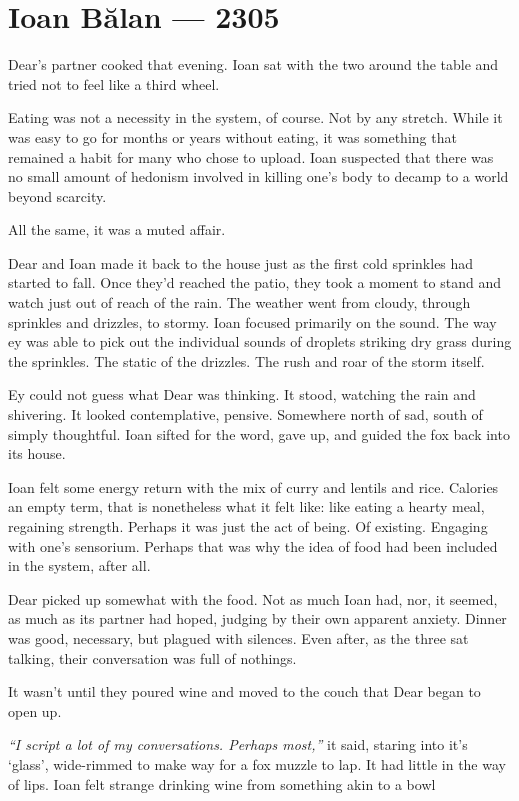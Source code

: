\hypertarget{ioan-bux103lan-2305}{%
\chapter*{Ioan Bălan — 2305}\label{ioan-bux103lan-2305}}

Dear's partner cooked that evening. Ioan sat with the two around the table and tried not to feel like a third wheel.

Eating was not a necessity in the system, of course. Not by any stretch. While it was easy to go for months or years without eating, it was something that remained a habit for many who chose to upload. Ioan suspected that there was no small amount of hedonism involved in killing one's body to decamp to a world beyond scarcity.

All the same, it was a muted affair.

Dear and Ioan made it back to the house just as the first cold sprinkles had started to fall. Once they'd reached the patio, they took a moment to stand and watch just out of reach of the rain. The weather went from cloudy, through sprinkles and drizzles, to stormy. Ioan focused primarily on the sound. The way ey was able to pick out the individual sounds of droplets striking dry grass during the sprinkles. The static of the drizzles. The rush and roar of the storm itself.

Ey could not guess what Dear was thinking. It stood, watching the rain and shivering. It looked contemplative, pensive. Somewhere north of sad, south of simply thoughtful. Ioan sifted for the word, gave up, and guided the fox back into its house.

Ioan felt some energy return with the mix of curry and lentils and rice. Calories an empty term, that is nonetheless what it felt like: like eating a hearty meal, regaining strength. Perhaps it was just the act of being. Of existing. Engaging with one's sensorium. Perhaps that was why the idea of food had been included in the system, after all.

Dear picked up somewhat with the food. Not as much Ioan had, nor, it seemed, as much as its partner had hoped, judging by their own apparent anxiety. Dinner was good, necessary, but plagued with silences. Even after, as the three sat talking, their conversation was full of nothings.

It wasn't until they poured wine and moved to the couch that Dear began to open up.

\emph{``I script a lot of my conversations. Perhaps most,''} it said, staring into it's `glass', wide-rimmed to make way for a fox muzzle to lap. It had little in the way of lips. Ioan felt strange drinking wine from something akin to a bowl

